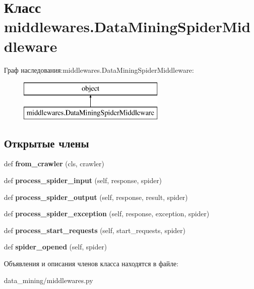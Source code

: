 \hypertarget{classmiddlewares_1_1DataMiningSpiderMiddleware}{}\section{Класс middlewares.\+Data\+Mining\+Spider\+Middleware}
\label{classmiddlewares_1_1DataMiningSpiderMiddleware}
Граф наследования\+:middlewares.\+Data\+Mining\+Spider\+Middleware\+:\begin{figure}[H]
\begin{center}
\leavevmode
\includegraphics[height=2.000000cm]{classmiddlewares_1_1DataMiningSpiderMiddleware}
\end{center}
\end{figure}
\subsection*{Открытые члены}
\begin{DoxyCompactItemize}
\item 
\mbox{\label{classmiddlewares_1_1DataMiningSpiderMiddleware_ab6e371356ca5c53fa4b062bfc212608b}} 
def {\bfseries from\+\_\+crawler} (cls, crawler)
\item 
\mbox{\label{classmiddlewares_1_1DataMiningSpiderMiddleware_a3a8b7b75911f5dd8ed5ff651a8e8e973}} 
def {\bfseries process\+\_\+spider\+\_\+input} (self, response, spider)
\item 
\mbox{\label{classmiddlewares_1_1DataMiningSpiderMiddleware_a08999e10ad91f078c5d41d24676895b0}} 
def {\bfseries process\+\_\+spider\+\_\+output} (self, response, result, spider)
\item 
\mbox{\label{classmiddlewares_1_1DataMiningSpiderMiddleware_a1d361f268988e8d57f5a8a838a29b8b4}} 
def {\bfseries process\+\_\+spider\+\_\+exception} (self, response, exception, spider)
\item 
\mbox{\label{classmiddlewares_1_1DataMiningSpiderMiddleware_a54b198f045af39cc060f003c669a9b76}} 
def {\bfseries process\+\_\+start\+\_\+requests} (self, start\+\_\+requests, spider)
\item 
\mbox{\label{classmiddlewares_1_1DataMiningSpiderMiddleware_a48cfdfe4488bdb5059821813230f02df}} 
def {\bfseries spider\+\_\+opened} (self, spider)
\end{DoxyCompactItemize}


Объявления и описания членов класса находятся в файле\+:\begin{DoxyCompactItemize}
\item 
data\+\_\+mining/middlewares.\+py\end{DoxyCompactItemize}
